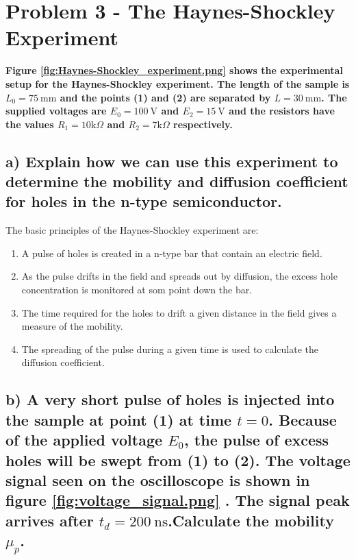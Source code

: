 \section{Problem 3 - The Haynes-Shockley Experiment}
\textbf{Figure \ref{fig:Haynes-Shockley_experiment.png} shows the experimental setup for the Haynes-Shockley experiment. The length of the sample is \( L_{0}=75 \mathrm{~mm} \) and the points (1) and (2) are separated by \( L=30 \mathrm{~mm} \). The supplied voltages are \( E_{0}=100 \mathrm{~V} \) and \( E_{2}=15 \mathrm{~V} \) and the resistors have the values \( R_{1}=10 \mathrm{k} \Omega \) and \( R_{2}=7 \mathrm{k} \Omega \) respectively.}


\subsection*{a) Explain how we can use this experiment to determine the mobility and diffusion coefficient for holes in the n-type semiconductor.}

The basic principles of the Haynes-Shockley experiment are:

\begin{enumerate}
    \item A pulse of holes is created in a n-type bar that contain an electric field.
    \item As the pulse drifts in the field and spreads out by diffusion, the excess hole concentration is monitored at som point down the bar.
    \item The time required for the holes to drift a given distance in the field gives a measure of the mobility.
    \item The spreading of the pulse during a given time is used to calculate the diffusion coefficient.
\end{enumerate}


\subsection*{b) A very short pulse of holes is injected into the sample at point (1) at time \( t=0 \). Because of the applied voltage \( E_{0} \), the pulse of excess holes will be swept from (1) to (2). The voltage signal seen on the oscilloscope is shown in figure \ref{fig:voltage_signal.png} . The signal peak arrives after \( t_{d}=200 \mathrm{~ns} \).Calculate the mobility \( \mu_{p} \).}

